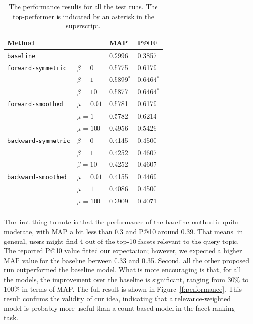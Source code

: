 \begin{table}[ht!]
  \centering
  \begin{tabular}{llll}
    Method & & MAP & P@10 \\
    \hline
    {\tt baseline} & & 0.2996 & 0.3857 \\
    {\tt forward-symmetric} & $\beta = 0$ & 0.5775 & 0.6179\\
    & $\beta = 1$ & 0.5899$^*$ & 0.6464$^*$ \\
    & $\beta = 10$ & 0.5877 & 0.6464$^*$ \\
    {\tt forward-smoothed} & $\mu = 0.01$ & 0.5781 & 0.6179 \\
    & $\mu = 1$ & 0.5782 & 0.6214 \\
    & $\mu = 100$ & 0.4956 & 0.5429 \\
    {\tt backward-symmetric} & $\beta = 0$ & 0.4145 & 0.4500\\
    & $\beta = 1$ & 0.4252 & 0.4607\\
    & $\beta = 10$ & 0.4252 & 0.4607\\
    {\tt backward-smoothed} & $\mu = 0.01$ & 0.4155 & 0.4469 \\
    & $\mu = 1$ & 0.4086 & 0.4500 \\
    & $\mu = 100$ & 0.3909 & 0.4071 \\
    \\
  \end{tabular}
  \caption{The performance results for all the test runs.  The top-performer is indicated by an asterisk in the superscript.}
  \label{t:performance}
\end{table}

The first thing to note is that the performance of the baseline method is quite
moderate, with MAP a bit less than 0.3 and P@10 around 0.39.  That means, in
general, users might find 4 out of the top-10 facets relevant to the query
topic.  The reported P@10 value fitted our expectation; however, we expected a
higher MAP value for the baseline between 0.33 and 0.35.  Second, all the other
proposed run outperformed the baseline model.  What is more encouraging is
that, for all the models, the improvement over the baseline is significant,
ranging from 30\% to 100\% in terms of MAP.  The full result is shown in
Figure~\ref{f:performance}.  This result confirms the validity of our idea,
indicating that a relevance-weighted model is probably more useful than a
count-based model in the facet ranking task.  

